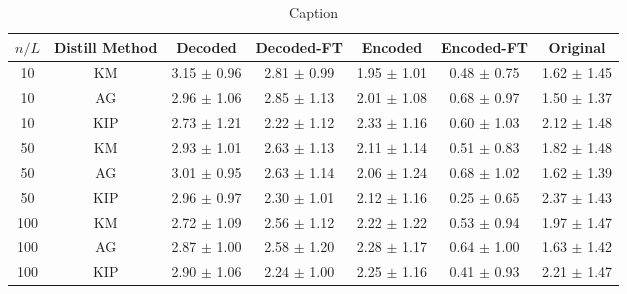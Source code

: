\begin{table*}[]
	\centering
	{\small
	\begin{tabular}{ccccccc}
		\toprule
		\textbf{$n/L$} & \textbf{Distill Method} & \textbf{Decoded} & \textbf{Decoded-FT} & \textbf{Encoded} & \textbf{Encoded-FT} & \textbf{Original}\\ \midrule
		10 & KM & 3.15 $\pm$ 0.96 & 2.81 $\pm$ 0.99 & 1.95 $\pm$ 1.01 & 0.48 $\pm$ 0.75 & 1.62 $\pm$ 1.45\\
		10 & AG & 2.96 $\pm$ 1.06 & 2.85 $\pm$ 1.13 & 2.01 $\pm$ 1.08 & 0.68 $\pm$ 0.97 & 1.50 $\pm$ 1.37\\
		10 & KIP & 2.73 $\pm$ 1.21 & 2.22 $\pm$ 1.12 & 2.33 $\pm$ 1.16 & 0.60 $\pm$ 1.03 & 2.12 $\pm$ 1.48\\
		50 & KM & 2.93 $\pm$ 1.01 & 2.63 $\pm$ 1.13 & 2.11 $\pm$ 1.14 & 0.51 $\pm$ 0.83 & 1.82 $\pm$ 1.48\\
		50 & AG & 3.01 $\pm$ 0.95 & 2.63 $\pm$ 1.14 & 2.06 $\pm$ 1.24 & 0.68 $\pm$ 1.02 & 1.62 $\pm$ 1.39\\
		50 & KIP & 2.96 $\pm$ 0.97 & 2.30 $\pm$ 1.01 & 2.12 $\pm$ 1.16 & 0.25 $\pm$ 0.65 & 2.37 $\pm$ 1.43\\
		100 & KM & 2.72 $\pm$ 1.09 & 2.56 $\pm$ 1.12 & 2.22 $\pm$ 1.22 & 0.53 $\pm$ 0.94 & 1.97 $\pm$ 1.47\\
		100 & AG & 2.87 $\pm$ 1.00 & 2.58 $\pm$ 1.20 & 2.28 $\pm$ 1.17 & 0.64 $\pm$ 1.00 & 1.63 $\pm$ 1.42\\
		100 & KIP & 2.90 $\pm$ 1.06 & 2.24 $\pm$ 1.00 & 2.25 $\pm$ 1.16 & 0.41 $\pm$ 0.93 & 2.21 $\pm$ 1.47\\
		\bottomrule
	\end{tabular}
	}
	\caption{Caption}
	\label{my_label}
\end{table*}
